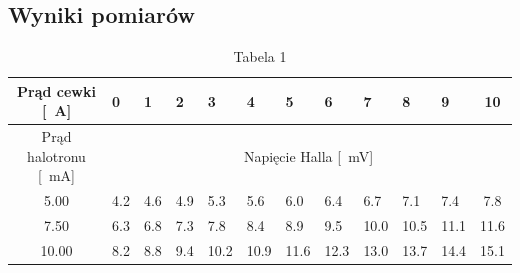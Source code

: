 \documentclass{fizykalab}
\begin{document}
{{\subsection*{Wyniki pomiarów}
\par
\begin{table}[!ht]
	\centering
	\begin{tabular}{|c|ccccccccccc|}
		\hline
		Prąd cewki {[}\SI{}{\ampere}{]}           & \multicolumn{1}{l|}{0}                                        & \multicolumn{1}{l|}{1}   & \multicolumn{1}{l|}{2}   & \multicolumn{1}{l|}{3}    & \multicolumn{1}{l|}{4}    & \multicolumn{1}{l|}{5}    & \multicolumn{1}{l|}{6}    & \multicolumn{1}{l|}{7}    & \multicolumn{1}{l|}{8}    & \multicolumn{1}{l|}{9}    & 10   \\ \hline
		Prąd halotronu {[}\SI{}{\milli\ampere}{]} & \multicolumn{11}{c|}{Napięcie Halla {[}\SI{}{\milli\volt}{]}}                                                                                                                                                                                                                                                                  \\ \hline
		5.00                                      & \multicolumn{1}{l|}{4.2}                                      & \multicolumn{1}{l|}{4.6} & \multicolumn{1}{l|}{4.9} & \multicolumn{1}{l|}{5.3}  & \multicolumn{1}{l|}{5.6}  & \multicolumn{1}{l|}{6.0}  & \multicolumn{1}{l|}{6.4}  & \multicolumn{1}{l|}{6.7}  & \multicolumn{1}{l|}{7.1}  & \multicolumn{1}{l|}{7.4}  & 7.8  \\ \hline
		7.50                                      & \multicolumn{1}{l|}{6.3}                                      & \multicolumn{1}{l|}{6.8} & \multicolumn{1}{l|}{7.3} & \multicolumn{1}{l|}{7.8}  & \multicolumn{1}{l|}{8.4}  & \multicolumn{1}{l|}{8.9}  & \multicolumn{1}{l|}{9.5}  & \multicolumn{1}{l|}{10.0} & \multicolumn{1}{l|}{10.5} & \multicolumn{1}{l|}{11.1} & 11.6 \\ \hline
		10.00                                     & \multicolumn{1}{l|}{8.2}                                      & \multicolumn{1}{l|}{8.8} & \multicolumn{1}{l|}{9.4} & \multicolumn{1}{l|}{10.2} & \multicolumn{1}{l|}{10.9} & \multicolumn{1}{l|}{11.6} & \multicolumn{1}{l|}{12.3} & \multicolumn{1}{l|}{13.0} & \multicolumn{1}{l|}{13.7} & \multicolumn{1}{l|}{14.4} & 15.1 \\ \hline
	\end{tabular}
	\caption*{Tabela 1}
\end{table}

}}
\end{document}
